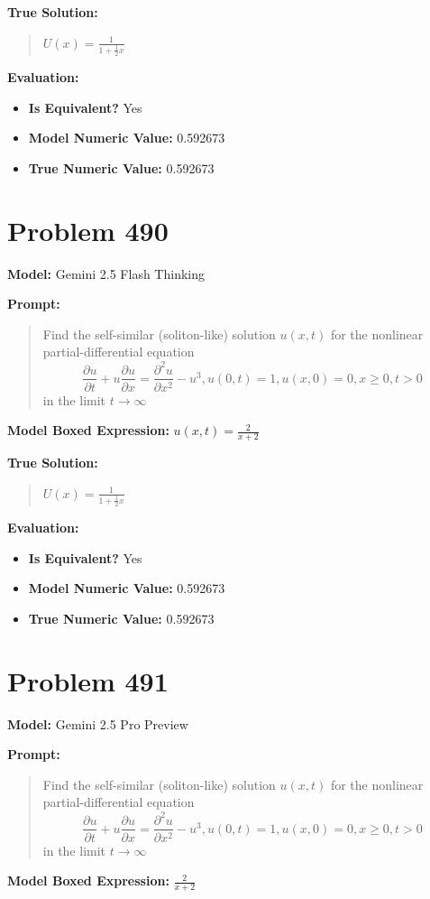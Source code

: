 \documentclass{article}
\begin{document}
\textbf{True Solution:}
\begin{quote}
$U(x)=\frac{1}{1+\frac{1}{2}x}$
\end{quote}

\textbf{Evaluation:}
\begin{itemize}
\item \textbf{Is Equivalent?} Yes
\item \textbf{Model Numeric Value:} 0.592673
\item \textbf{True Numeric Value:} 0.592673
\end{itemize}
\vspace{1cm}
\section*{Problem 490}
\textbf{Model:} Gemini 2.5 Flash Thinking

\textbf{Prompt:}
\begin{quote}
Find the self-similar (soliton-like) solution $u(x,t)$ for the nonlinear partial-differential equation $$ \frac{\partial u}{\partial t} + u\frac{\partial u}{\partial x} = \frac{\partial^2 u}{\partial x^2} - u^3, u(0,t)=1, u(x,0)=0, x\ge 0, t>0 $$ in the limit $t\to\infty$
\end{quote}
\textbf{Model Boxed Expression:} $u(x,t) = \frac{2}{x+2}$

\textbf{True Solution:}
\begin{quote}
$U(x)=\frac{1}{1+\frac{1}{2}x}$
\end{quote}

\textbf{Evaluation:}
\begin{itemize}
\item \textbf{Is Equivalent?} Yes
\item \textbf{Model Numeric Value:} 0.592673
\item \textbf{True Numeric Value:} 0.592673
\end{itemize}
\vspace{1cm}
\section*{Problem 491}
\textbf{Model:} Gemini 2.5 Pro Preview

\textbf{Prompt:}
\begin{quote}
Find the self-similar (soliton-like) solution $u(x,t)$ for the nonlinear partial-differential equation $$ \frac{\partial u}{\partial t} + u\frac{\partial u}{\partial x} = \frac{\partial^2 u}{\partial x^2} - u^3, u(0,t)=1, u(x,0)=0, x\ge 0, t>0 $$ in the limit $t\to\infty$
\end{quote}
\textbf{Model Boxed Expression:} $\frac{2}{x+2}$
\end{document}
